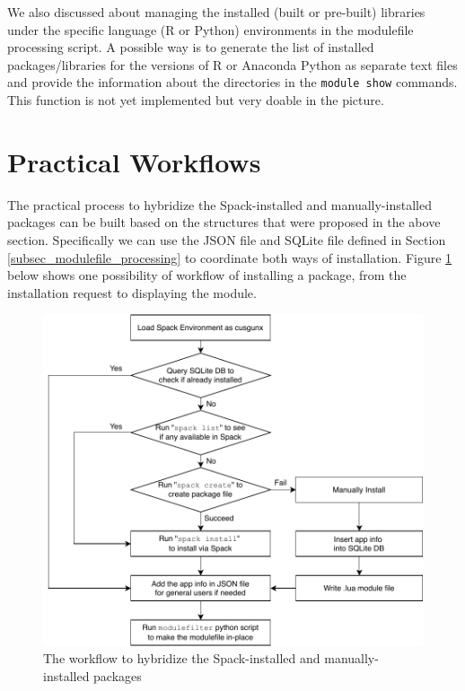 \documentclass[conference]{IEEEtran}
\begin{document}
\begin{itemize}
\end{itemize}

We also discussed about managing the installed (built or pre-built) libraries under the specific language (R or Python) environments in the modulefile processing script. A possible way is to generate the list of installed packages/libraries for the versions of R or Anaconda Python as separate text files and provide the information about the directories in the \texttt{module show} commands. This function is not yet implemented but very doable in the picture.


\section{Practical Workflows} \label{sec_workflow}

The practical process to hybridize the Spack-installed and manually-installed packages can be built based on the structures that were proposed in the above section. Specifically we can use the JSON file and SQLite file defined in Section \ref{subsec_modulefile_processing} to coordinate both ways of installation. Figure \ref{fig:spack_h2_hybrid_flow} below shows one possibility of workflow of installing a package, from the installation request to displaying the module.

\begin{figure}[htbp]
  \centerline{\includegraphics[width=\linewidth]{figures/spack_h2_hybrid_flow}}
  \caption{The workflow to hybridize the Spack-installed and manually-installed packages}
  \label{fig:spack_h2_hybrid_flow}
\end{figure}
\end{document}
